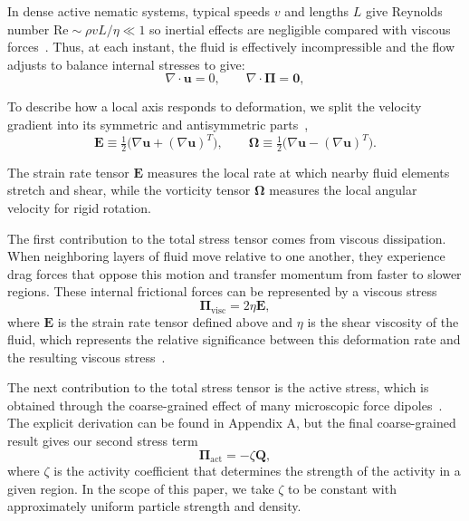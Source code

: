 \documentclass[11pt]{article}
\begin{document}
In dense active nematic systems, typical speeds $v$ and lengths $L$ give Reynolds number $\mathrm{Re}\sim \rho vL/\eta\ll 1$ so inertial effects are negligible compared with viscous forces~\cite{simha2002hydrodynamic}. Thus, at each instant, the fluid is effectively incompressible and the flow adjusts to balance internal stresses to give:
\begin{equation}
\nabla\!\cdot\!\mathbf{u}=0, \qquad \nabla\!\cdot\!\boldsymbol{\Pi} = \mathbf{0},
\label{eq:navier-stokes}
\end{equation}

To describe how a local axis responds to deformation, we split the velocity gradient into its symmetric and antisymmetric parts~\cite{doostmohammadi2018active, beris1994thermodynamics, Bhattacharyya2024ActiveNematicsMechanobiology},
\begin{equation}
    \mathbf{E}\equiv\tfrac12\!\big(\nabla\mathbf{u}+(\nabla\mathbf{u})^{T}\big),\qquad \boldsymbol{\Omega}\equiv\tfrac12\!\big(\nabla\mathbf{u}-(\nabla\mathbf{u})^{T}\big).
\end{equation}

The strain rate tensor $\mathbf{E}$ measures the local rate at which nearby fluid elements stretch and shear, while the vorticity tensor $\boldsymbol{\Omega}$ measures the local angular velocity for rigid rotation. 

The first contribution to the total stress tensor comes from viscous dissipation. When neighboring layers of fluid move relative to one another, they experience drag forces that oppose this motion and transfer momentum from faster to slower regions. These internal frictional forces can be represented by a viscous stress 
\begin{equation}
    \boldsymbol{\Pi}_{\mathrm{visc}} = 2\eta\mathbf{E},
\end{equation}
where $\mathbf{E}$ is the strain rate tensor defined above and $\eta$ is the shear viscosity of the fluid, which represents the relative significance between this deformation rate and the resulting viscous stress~\cite{degennes1993physics}. 

The next contribution to the total stress tensor is the active stress, which is obtained through the coarse-grained effect of many microscopic force dipoles~\cite{simha2002hydrodynamic}. The explicit derivation can be found in Appendix A, but the final coarse-grained result gives our second stress term 
\begin{equation}
    \boldsymbol{\Pi}_{\mathrm{act}} = -\zeta \textbf{Q},
\end{equation}
where $\zeta$ is the activity coefficient that determines the strength of the activity in a given region. In the scope of this paper, we take $\zeta$ to be constant with approximately uniform particle strength and density.
\end{document}
